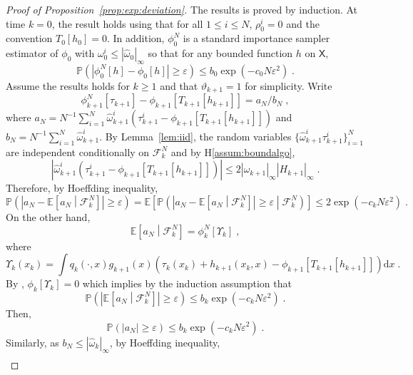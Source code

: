\documentclass[12pt]{article}
\newcommand{\rmd}{\mathrm{d}}
\newcommand{\eqsp}{\;}
\newcommand{\1}{\mathrm{1}}
\begin{document}
\begin{proof}[Proof of Proposition~\ref{prop:exp:deviation}]
The results is proved by induction. At time $k=0$, the result holds using that for all $1\le i \le N$, $\rho_0^i = 0$ and the convention $T_0[h_0] =0$. In addition, $\phi_0^N$ is a standard importance sampler estimator of $\phi_0$ with $\omega_0^i\le |\widehat{\omega}_0|_{\infty}$ so that for any bounded function $h$ on $\mathsf{X}$,
\[
\mathbb{P}\left(\left|\phi_0^N[h] - \phi_0\left[h\right]\right|\ge \varepsilon\right)\le b_0\exp\left(-c_0N\varepsilon^2\right)\eqsp.
\]
Assume the results holds for $k\ge 1$ and that $\vartheta_{k+1} = 1$ for simplicity. Write
\[
\phi_{k+1}^N[\tau_{k+1}] - \phi_{k+1}\left[T_{k+1}[h_{k+1}]\right] = a_N/b_N\eqsp,
\]
where $a_N = N^{-1}\sum_{i=1}^N \widehat{\omega}_{k+1}^i \left(\tau_{k+1}^i - \phi_{k+1}\left[T_{k+1}[h_{k+1}]\right]\right)$ and $b_N =N^{-1}\sum_{i=1}^N \widehat{\omega}_{k+1}^i$. By Lemma~\ref{lem:iid}, the random variables $\{\widehat{\omega}_{k+1}^i\tau_{k+1}^i\}_{i=1}^N$ are independent conditionally on $\mathcal{F}_k^{N}$ and by H\ref{assum:boundalgo},
\[
\left|\widehat{\omega}_{k+1}^i \left(\tau_{k+1}^i - \phi_{k+1}\left[T_{k+1}[h_{k+1}]\right]\right)\right| \le 2|\widehat{\omega}_{k+1}|_{\infty}|H_{k+1}|_{\infty}\eqsp.
\]
Therefore, by Hoeffding inequality,
\[
\mathbb{P}\left(\left|a_N - \mathbb{E}\left[a_N\middle|\mathcal{F}_k^{N}\right]\right|\ge \varepsilon\right) = \mathbb{E}\left[\mathbb{P}\left(\left|a_N - \mathbb{E}\left[a_N\middle|\mathcal{F}_k^{N}\right]\right|\ge \varepsilon\middle|\mathcal{F}_k^{N}\right)\right]\le 2\exp\left(-c_kN\varepsilon^2\right)\eqsp.
\] 
On the other hand,
\[
\mathbb{E}\left[a_N\middle|\mathcal{F}_k^{N}\right] = \phi^N_{k}\left[\Upsilon_k\right] \eqsp,
\]
where
\[
\Upsilon_k(x_k) = \int q_{k}(\cdot,x)g_{k+1}(x)\left(\tau_k(x_k) + h_{k+1}(x_k,x) - \phi_{k+1}\left[T_{k+1}[h_{k+1}]\right]\right)\rmd x\eqsp.
\]
By \cite[Lemma~11]{olsson:westerborn:2016}, $\phi_{k}\left[\Upsilon_k\right] = 0$ which implies by the induction assumption that 
\[
\mathbb{P}\left(\left|\mathbb{E}\left[a_N\middle|\mathcal{F}_k^{N}\right]\right|\ge \varepsilon\right)\le b_k\exp\left(-c_kN\varepsilon^2\right)\eqsp.
\]
Then,
\[
\mathbb{P}\left(\left|a_N\right|\ge \varepsilon\right) \le b_k\exp\left(-c_kN\varepsilon^2\right)\eqsp.
\] 
Similarly, as $b_N \le |\widehat{\omega}_k|_{\infty}$, by Hoeffding inequality,
\begin{multline*}

\end{multline*}
\end{proof}
\end{document}
